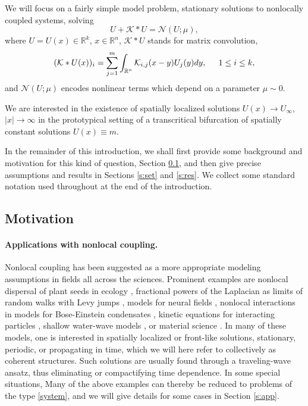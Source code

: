 \documentclass[10pt]{article}
\newcommand{\R}{\mathbb{R}}
\newcommand{\Nl}{\mathcal{N}}
\newcommand{\K}{\mathcal{K}}
\begin{document}
We will focus on a fairly simple model problem, stationary solutions to nonlocally coupled systems, solving
\begin{equation} \label{system}
U+\K\ast U = \Nl(U;\mu) ,
\end{equation}
where $U=U(x)\in\R^k$, $x\in\R^n$, $\K\ast U$ stands for matrix convolution,
\[
(\K\ast U(x))_i = \sum_{j=1}^m \int_{\R^n} \K_{i,j}(x-y)U_j(y)dy, \hspace{0.2in} 1\le i\le k,
\]
and $\Nl(U;\mu)$ encodes nonlinear terms which depend on a parameter $\mu\sim 0$. 

We are interested in the existence of spatially localized solutions $U(x)\to U_\infty$, $|x|\to\infty$ in the  prototypical setting of a transcritical bifurcation of spatially constant solutions $U(x)\equiv m$. 

In the remainder of this introduction, we shall first provide some background and motivation for this kind of question, Section \ref{s:mot}, and then give precise assumptions and results in Sections \ref{s:set} and \ref{s:res}. We collect some standard notation used throughout at the end of the introduction. 


\subsection{Motivation}\label{s:mot}

\paragraph{Applications with nonlocal coupling.} Nonlocal coupling has been suggested as a more appropriate modeling assumptions in fields all across the sciences. Prominent examples are nonlocal dispersal of plant seeds in ecology \cite{plantdisp}, fractional powers of the Laplacian as limits of random walks with Levy jumps \cite{levy}, models for neural fields \cite{neuralfieldrev}, nonlocal interactions in models for Bose-Einstein condensates \cite{bose}, kinetic equations for interacting particles \cite{swarmingrev}, shallow water-wave models \cite{waterwave}, or material science \cite{matsci}. In many of these models, one is interested in spatially localized or front-like solutions, stationary, periodic,  or  propagating in time,  which we will here refer to collectively as  coherent structures. Such solutions are usually found through a traveling-wave ansatz, thus eliminating or compactifying time dependence.  In some special situations, Many of the above examples can thereby be reduced to problems of the type \eqref{system}, and we will give details for some cases in Section \ref{s:app}. 
\end{document}
